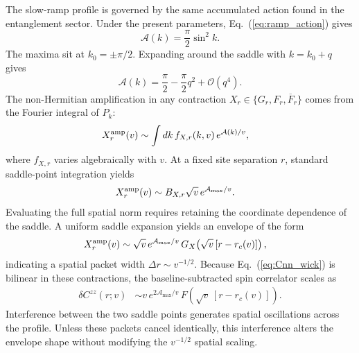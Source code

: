 \documentclass[aps,prb,reprint,superscriptaddress,amsmath,amssymb,floatfix]{revtex4-2}
\begin{document}
  The slow-ramp profile is governed by the same accumulated action found in the entanglement sector. Under the present parameters, Eq.~(\ref{eq:ramp_action}) gives
\begin{equation}
\mathcal A(k) = \frac{\pi}{2}\sin^2 k.
\label{eq:czz_action}
\end{equation}
The maxima sit at $k_0=\pm\pi/2$. Expanding around the saddle with $k=k_0+q$ gives
\begin{equation}
\mathcal A(k) = \frac{\pi}{2} - \frac{\pi}{2}q^2 + \mathcal O(q^4).
\label{eq:czz_action_saddle}
\end{equation}
The non-Hermitian amplification in any contraction $X_r\in\{G_r,F_r,\overline F_r\}$ comes from the Fourier integral of $P_k$:
\begin{equation}
\begin{aligned}
X_r^{\rm amp}(v) &\sim \int dk\, f_{X,r}(k,v)\, e^{\mathcal A(k)/v},
\end{aligned} \label{eq:czz_contraction_saddle}
\end{equation}
where $f_{X,r}$ varies algebraically with $v$. At a fixed site separation $r$, standard saddle-point integration yields
\begin{equation}
\begin{aligned}
X_r^{\rm amp}(v) &\sim B_{X,r}\sqrt v\, e^{\mathcal A_{\max}/v}.
\end{aligned} \label{eq:czz_contraction_prefactor}
\end{equation}
Evaluating the full spatial norm requires retaining the coordinate dependence of the saddle. A uniform saddle expansion yields an envelope of the form
\begin{equation}
\begin{aligned}
X_r^{\rm amp}(v) &\sim \sqrt v\, e^{\mathcal A_{\max}/v}\, G_X\!\left( \sqrt v\,[r-r_c(v)] \right),
\end{aligned} \label{eq:czz_contraction_packet}
\end{equation}
indicating a spatial packet width $\Delta r\sim v^{-1/2}$. Because Eq.~(\ref{eq:Cnn_wick}) is bilinear in these contractions, the baseline-subtracted spin correlator scales as
\begin{equation}
\begin{aligned}
\delta C^{zz}(r;v) &\sim v\, e^{2\mathcal A_{\max}/v}\, F\!\left( \sqrt v\,[r-r_c(v)] \right).
\end{aligned} \label{eq:czz_uniform_profile}
\end{equation}
Interference between the two saddle points generates spatial oscillations across the profile. Unless these packets cancel identically, this interference alters the envelope shape without modifying the $v^{-1/2}$ spatial scaling.
\end{document}

